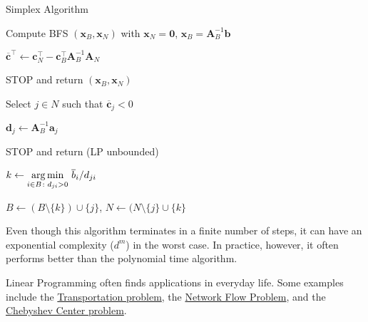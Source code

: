 \begin{algorithm}[!ht]
  \caption{Simplex Algorithm}\label{simplex}
  \begin{algorithmic}[1]

    
    \State Compute BFS $(\mathbf{x}_B, \mathbf{x}_N)$ with $\mathbf{x}_N = \mathbf{0}$, $\mathbf{x}_B = \mathbf{A}_B^{-1}\mathbf{b}$
    
    \State $\overline{\mathbf{c}}^{\top} \gets \mathbf{c}_N^{\top} - \mathbf{c}_B^{\top} \mathbf{A}_B^{-1} \mathbf{A}_N$

        \State STOP and return $(\mathbf{x}_B, \mathbf{x}_N)$
    \EndIf

    \State Select $j \in N$ such that $\overline{\mathbf{c}}_j < 0$

    \State $\mathbf{d}_j \gets \mathbf{A}_B^{-1} \mathbf{a}_j$

        \State STOP and return (LP unbounded)
    \EndIf

    \State $k \gets \displaystyle\operatorname*{arg\,min}_{i \in B \colon d_{ji} > 0} \, \overline{b}_i / d_{ji}$

    \State $B \gets (B \setminus \{k\}) \cup \{j\}$, $N \gets (N \setminus \{j\} \cup \{k\}$

    \EndWhile
    \EndFunction
  \end{algorithmic}
\end{algorithm}

\newpage

Even though this algorithm terminates in a finite number of steps, it can have an exponential complexity ($d^m$) in the worst case. In practice, however, it often performs better than the polynomial time algorithm.

Linear Programming often finds applications in everyday life. Some examples include the \href{https://towardsdatascience.com/operations-research-in-r-transportation-problem-1df59961b2ad}{Transportation problem}, the \href{https://optimization.mccormick.northwestern.edu/index.php/Network_flow_problem#:~:text=Network%20Flow%20Optimization%20problems%20form,viewed%20as%20minimizing%20transportation%20problems.}{Network Flow Problem}, and the \href{https://en.wikipedia.org/wiki/Chebyshev_center}{Chebyshev Center problem}.